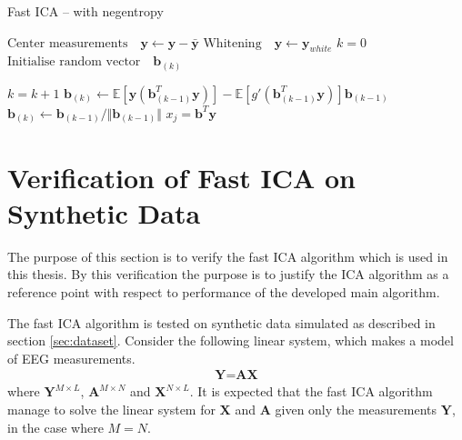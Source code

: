 \begin{algorithm}[H]
\caption{Fast ICA -- with negentropy }
\begin{algorithmic}[1]
			\State $\text{Center measurements} \quad \textbf{y} \gets \textbf{y} - \bar{\textbf{y}}$
			\State $\text{Whitening} \quad \textbf{y}\gets \textbf{y}_{white}$ 
			\EndProcedure  
			\State
			\State$k=0$            
            \State$\text{Initialise random vector} \quad \textbf{b}_{(k)}$ 
            
               		\State $k = k+1$
                	\State $\textbf{b}_{(k)} \gets \mathbb{E}[ \textbf{y}(\textbf{b}_{(k-1)}^T \textbf{y})] - \mathbb{E}[g'(\textbf{b}_{(k-1)}^T \textbf{y})] \textbf{b}_{(k-1)}$  
                	\State $\textbf{b}_{(k)} \gets \textbf{b}_{(k-1)}/\Vert \textbf{b}_{(k-1)} \Vert $ 
          		\EndWhile
          		\State $x_{j} = \textbf{b}^T\textbf{y}$
          	\EndFor
          	
            \EndProcedure
        \end{algorithmic} 
        \label{alg:fastICA}
\end{algorithm}


\section{Verification of Fast ICA on Synthetic Data}\label{app:ica_test}
The purpose of this section is to verify the fast ICA algorithm which is used in this thesis. By this verification the purpose is to justify the ICA algorithm as a reference point with respect to performance of the developed main algorithm.

The fast ICA algorithm is tested on synthetic data simulated as described in section \ref{sec:dataset}. 
Consider the following linear system, which makes a model of EEG measurements.  
\begin{align*}
\textbf{Y}=\textbf{AX}
\end{align*}
where $\textbf{Y}^{M\times L}$, $\textbf{A}^{M\times N}$ and $\textbf{X}^{N\times L}$. It is expected that the fast ICA algorithm manage to solve the linear system for $\textbf{X}$ and $\textbf{A}$ given only the measurements $\textbf{Y}$, in the case where $M=N$.  

